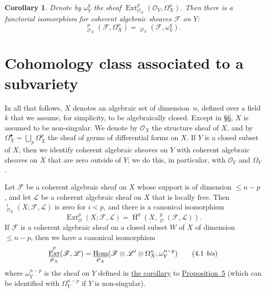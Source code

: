 \documentclass{article}
\theoremstyle{plain}
\newenvironment{lemma}[1]
  {\renewcommand\theinnerlemma{#1}\innerlemma}
  {\endinnerlemma}
\newtheorem*{corollary*}{Corollary}
\theoremstyle{definition}
\newcommand{\scr}[1]{{\mathscr{#1}}}
\renewcommand{\leq}{\leqslant}
\DeclareMathOperator{\Ext}{Ext}
\DeclareMathOperator{\shExt}{\underline{Ext}}
\DeclareMathOperator{\shHom}{\underline{Hom}}
\DeclareMathOperator{\HH}{H}
\begin{document}
\begin{corollary*}
\label{proposition5corollary}
  Denote by $\omega_Y^q$ the sheaf $\Ext_{\scr{O}_X}^p(\scr{O}_Y,\Omega_X^n)$.
  Then there is a functorial isomorphism for coherent algebraic sheaves $\scr{F}$ on $Y$:
  \[
  \label{3.8}
    \shExt_{\scr{O}_X}^p(\scr{F},\Omega_X^n) = \shHom_{\scr{O}_X}(\scr{F},\omega_Y^q).
  \tag{3.8}
  \]
\end{corollary*}


\section{Cohomology class associated to a subvariety}
\label{section4}

In all that follows, $X$ denotes an algebraic set of dimension~$n$, defined over a field $k$ that we assume, for simplicity, to be algebraically closed.
Except in \hyperref[section6]{\S6}, $X$ is assumed to be non-singular.
We denote by $\scr{O}_X$ the structure sheaf of $X$, and by $\Omega_X^\bullet=\bigcup_p\Omega_X^p$ the sheaf of germs of differential forms on $X$.
If $Y$ is a closed subset of $X$, then we identify coherent algebraic sheaves on $Y$ with coherent algebraic sheaves on $X$ that are zero outside of $Y$;
we do this, in particular, with $\scr{O}_Y$ and $\Omega_Y$.

\begin{lemma}{1}
\label{lemma1}
  Let $\scr{F}$ be a coherent algebraic sheaf on $X$ whose support is of dimension $\leq n-p$, and let $\scr{L}$ be a coherent algebraic sheaf on $X$ that is locally free.
  Then $\shExt_{\scr{O}_X}^i(X;\scr{F},\scr{L})$ is zero for $i<p$, and there is a canonical isomorphism
  \[
  \label{4.1}
    \Ext_\scr{O}^p(X;\scr{F},\scr{L}) = \HH^0(X,\shExt_\scr{O}^p(\scr{F},\scr{L})).
  \tag{4.1}
  \]
  If $\scr{F}$ is a coherent algebraic sheaf on a closed subset $W$ of $X$ of dimension $\leq n-p$, then we have a canonical isomorphism
  \[
  \label{4.1bis}
    \shExt_{\scr{O}_X}^p(\scr{F},\scr{L}) = \shHom_{\scr{O}_X}(\scr{F}\otimes\scr{L}'\otimes\Omega_X^n,\omega_Y^{n-p})
  \tag{4.1 \emph{bis}}
  \]
  where $\omega_Y^{n-p}$ is the sheaf on $Y$ defined in \hyperref[proposition5corollary]{the corollary} to \hyperref[proposition5]{Proposition~5} (which can be identified with $\Omega_Y^{n-p}$ if $Y$ is non-singular).
\end{lemma}
\end{document}
